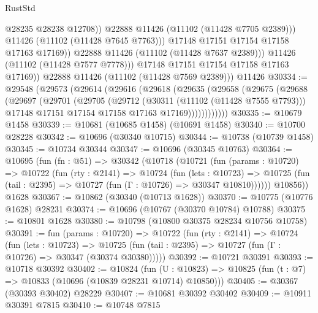 \begin{lexlean}{RustStd}
\begin{coremodule}
                          @28235
                          @28238
                          @12708))
                      @22888
                      @11426
                      (@11102 (@11428 @7705 @2389)))
                    @11426
                    (@11102 (@11428 @7645 @7763)))
                  @17148
                  @17151
                  @17154
                  @17158
                  @17163
                  @17169))
              @22888
              @11426
              (@11102 (@11428 @7637 @2389)))
            @11426
            (@11102 (@11428 @7577 @7778)))
          @17148
          @17151
          @17154
          @17158
          @17163
          @17169))
      @22888
      @11426
      (@11102 (@11428 @7569 @2389)))
    @11426
@30334 := @29548
    (@29573
      (@29614
        (@29616
          (@29618
            (@29635
              (@29658
                (@29675
                  (@29688
                    (@29697
                      (@29701
                        (@29705
                          (@29712
                            (@30311 (@11102 (@11428 @7555 @7793)))
                            @17148
                            @17151
                            @17154
                            @17158
                            @17163
                            @17169))))))))))))
@30335 := @10679 @1458
@30339 := @10681 (@10685 @1458) (@10691 @1458)
@30340 := @10700 @28228
@30342 := @10696 (@30340 @10715)
@30344 := @10738 (@10739 @1458)
@30345 := @10734 @30344
@30347 := @10696 (@30345 @10763)
@30364 := @10695
    (fun (fn : @51) =>
    @30342
      (@10718
        (@10721
          (fun (params : @10720) =>
          @10722
            (fun (rty : @2141) =>
            @10724
              (fun (lets : @10723) =>
              @10725 (fun (tail : @2395) => @10727 (fun (Γ : @10726) => @30347 @10810))))))
        @10856))
    @1628
@30367 := @10862 (@30340 (@10713 @1628))
@30370 := @10775 (@10776 @1628) @28231
@30374 := @10696 (@10767 (@30370 @10784) @10788)
@30375 := @10801 @1628
@30380 := @10798 (@10800 @30375 @28234 @10756 @10758)
@30391 := fun (params : @10720) =>
  @10722
    (fun (rty : @2141) =>
    @10724
      (fun (lets : @10723) =>
      @10725 (fun (tail : @2395) => @10727 (fun (Γ : @10726) => @30347 (@30374 @30380)))))
@30392 := @10721 @30391
@30393 := @10718 @30392
@30402 := @10824
    (fun (U : @10823) => @10825 (fun (t : @7) => @10833 (@10696 (@10839 @28231 @10714) @10850)))
@30405 := @30367 (@30393 @30402) @28229
@30407 := @10681 @30392 @30402
@30409 := @10911 @30391 @7815
@30410 := @10748 @7815

\end{coremodule}
\end{lexlean}
